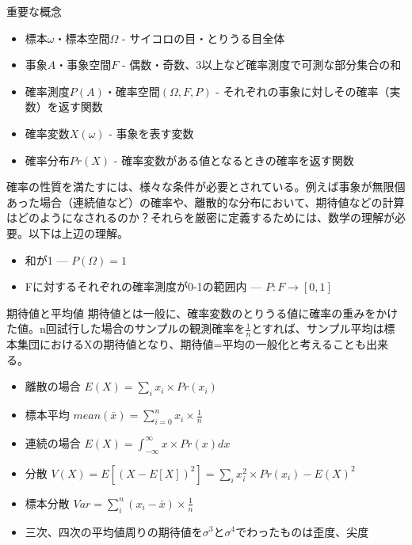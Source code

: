 \documentclass[cjk, aspectratio=169]{beamer}
\begin{document}
\begin{frame}{重要な概念}
\begin{itemize}
    \item 標本$\omega$・標本空間$\Omega$ - サイコロの目・とりうる目全体
    \item 事象$A$・事象空間$F$ - 偶数・奇数、3以上など確率測度で可測な部分集合の和
    \item 確率測度$P(A)$・確率空間$(\Omega,F,P)$ - それぞれの事象に対しその確率（実数）を返す関数
    \item 確率変数$X(\omega)$ - 事象を表す変数
    \item 確率分布$Pr(X)$ - 確率変数がある値となるときの確率を返す関数
\end{itemize}
\end{frame}

\begin{frame}
確率の性質を満たすには、様々な条件が必要とされている。例えば事象が無限個あった場合（連続値など）の確率や、離散的な分布において、期待値などの計算はどのようになされるのか？それらを厳密に定義するためには、数学の理解が必要。以下は上辺の理解。
\begin{itemize}
\item 和が1 --- $P(\Omega) = 1$
\item Fに対するそれぞれの確率測度が0-1の範囲内 --- $P:F \rightarrow [0,1]$
\end{itemize}
\end{frame}

\begin{frame}{期待値と平均値}
期待値とは一般に、確率変数のとりうる値に確率の重みをかけた値。n回試行した場合のサンプルの観測確率を$\frac{1}{n}$とすれば、サンプル平均は標本集団におけるXの期待値となり、期待値=平均の一般化と考えることも出来る。
\begin{itemize}
\item 離散の場合 $E(X)=\sum_{i} x_i \times Pr(x_i)$
\item 標本平均 $ mean (\bar{x}) = \sum_{i=0}^{n} x_i \times \frac{1}{n}$
\item 連続の場合 $E(X)=\int_{-\infty}^{\infty} x \times Pr(x) dx$
\item 分散 $V(X) = E[(X-E[X])^2] = \sum_{i} x_i^2 \times Pr(x_i) - E(X)^2 $
\item 標本分散 $ Var = \sum_{i}^{n} (x_i - \bar{x}) \times \frac{1}{n} $
\item 三次、四次の平均値周りの期待値を$\sigma^3$と$\sigma^4$でわったものは歪度、尖度
\end{itemize}
\end{frame}
\end{document}
